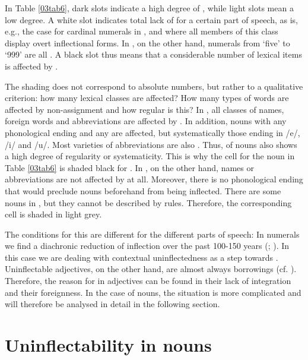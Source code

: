 \documentclass[output=paper,colorlinks,citecolor=brown]{langscibook}
\begin{document}
In Table \ref{03tab6}, dark slots indicate a high degree of , while light slots mean a low degree. A white slot indicates total lack of  for a certain part of speech, as is, e.g., the case for cardinal numerals in ,  and  where all members of this class display overt inflectional forms. In , on the other hand, numerals from `five' to `999' are all . A black slot thus means that a considerable number of lexical items is affected by .

The shading does not correspond to absolute numbers, but rather to a qualitative criterion: how many lexical classes are affected? How many types of words are affected by non-assignment and how regular is this? In , all classes of names, foreign words and abbreviations are affected by . In addition, nouns with any phonological ending and any  are affected, but systematically those ending in /e/, /i/ and /u/. Most varieties of abbreviations are also . Thus,  of nouns also shows a high degree of regularity or systematicity. This is why the cell for the noun in Table \ref{03tab6} is shaded black for . In , on the other hand, names or abbreviations are not affected by  at all. Moreover, there is no phonological ending that would preclude nouns beforehand from being inflected. There are some  nouns in , but they cannot be described by rules. Therefore, the corresponding cell is shaded in light grey.

The conditions for this  are different for the different parts of speech: In numerals we find a diachronic reduction of inflection over the past 100-150 years (\citealt{suprun1969}; \citealt[297--313]{doleschal2000}). In this case we are dealing with contextual uninflectedness as a step towards . Uninflectable adjectives, on the other hand, are almost always borrowings (cf. \citealt[277--297]{doleschal2000}). Therefore, the reason for  in adjectives can be found in their lack of integration and their foreignness. In the case of nouns, the situation is more complicated and will therefore be analysed in detail in the following section.

\section{Uninflectability in nouns} \label{03sec4}
\end{document}
